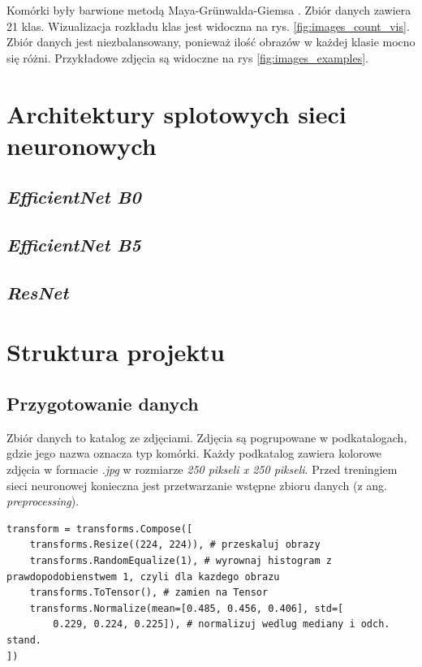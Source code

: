 Komórki były barwione metodą Maya-Grünwalda-Giemsa \cite{histology}. Zbiór danych zawiera 21 klas.
Wizualizacja rozkładu klas jest widoczna na rys. \ref{fig:images_count_vis}.
Zbiór danych jest niezbalansowany, ponieważ ilość obrazów w każdej klasie mocno się różni.
Przykładowe zdjęcia są widoczne na rys \ref{fig:images_examples}.


\section{Architektury splotowych sieci neuronowych}

\subsection{\textit{EfficientNet B0}}

\subsection{\textit{EfficientNet B5}}

\subsection{\textit{ResNet}}


\section{Struktura projektu}

\subsection{Przygotowanie danych}

Zbiór danych to katalog ze zdjęciami. Zdjęcia są pogrupowane w podkatalogach, gdzie jego nazwa oznacza typ komórki.
Każdy podkatalog zawiera kolorowe zdjęcia w formacie \textit{.jpg} w rozmiarze \textit{250 pikseli x 250 pikseli}.
Przed treningiem sieci neuronowej konieczna jest przetwarzanie wstępne zbioru danych (z ang. \textit{preprocessing}).

\begin{lstlisting}[language=ipython,caption={Transformacja danych}, label={lst:transforms}]
transform = transforms.Compose([
    transforms.Resize((224, 224)), # przeskaluj obrazy
    transforms.RandomEqualize(1), # wyrownaj histogram z prawdopodobienstwem 1, czyli dla kazdego obrazu
    transforms.ToTensor(), # zamien na Tensor
    transforms.Normalize(mean=[0.485, 0.456, 0.406], std=[
        0.229, 0.224, 0.225]), # normalizuj wedlug mediany i odch. stand.
])
\end{lstlisting}

